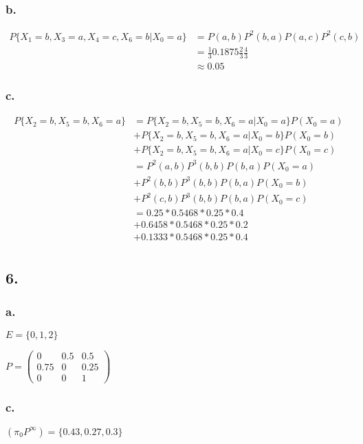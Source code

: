 \documentclass[12pt,fleqn]{article}
\begin{document}
\subsubsection*{b.}
\begin{align*}
  P\{X_1 = b, X_3 = a, X_4 = c, X_6 = b|X_0 = a\}&=P(a,b)P^2(b,a)P(a,c)P^2(c,b)\\
                                                 &=\frac{1}{3}0.1875\frac{2}{3}\frac{4}{3}\\
                                                 &\approx 0.05
\end{align*}
\subsubsection*{c.}
\begin{align*}
  P \{X_2 = b, X_5 = b, X_6 = a\}&=P \{X_2 = b, X_5 = b, X_6 = a|X_0=a\}P(X_0=a)\\
                                 &+P \{X_2 = b, X_5 = b, X_6 = a|X_0=b\}P(X_0=b)\\
                                 &+P \{X_2 = b, X_5 = b, X_6 = a|X_0=c\}P(X_0=c)\\
                                 &=P^2(a,b)P^3(b,b)P(b,a)P(X_0=a)\\
                                 &+P^2(b,b)P^3(b,b)P(b,a)P(X_0=b)\\
                                 &+P^2(c,b)P^3(b,b)P(b,a)P(X_0=c)\\
                                 &=0.25*0.5468*0.25*0.4\\
                                 &+0.6458*0.5468*0.25*0.2\\
                                 &+0.1333*0.5468*0.25*0.4\\
\end{align*}
\subsection*{6.}
\subsubsection*{a.}
$E=\{0,1,2\}$

$P=\begin{pmatrix}
  0&0.5&0.5\\
  0.75&0&0.25\\
  0&0&1
\end{pmatrix}$
\subsubsection*{c.}
$(\pi_0P^\infty)=\{0.43,0.27,0.3\}$
\end{document}
